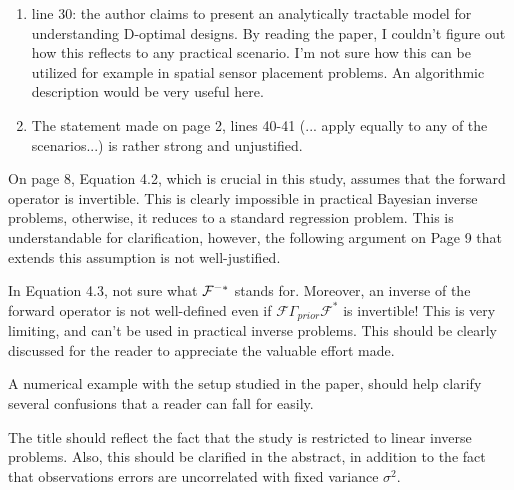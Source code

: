 \documentclass{amsart}
\begin{document}
\begin{enumerate}
\item line 30: the author claims to present an analytically tractable
  model for understanding D-optimal designs. By reading the paper, I
  couldn't figure out how this reflects to any practical scenario. I'm
  not sure how this can be utilized for example in spatial sensor
  placement problems. An algorithmic description would be very useful
  here.

\item The statement made on page 2, lines 40-41 (... apply equally to
  any of the scenarios...) is rather strong and unjustified.
\end{enumerate}

On page 8, Equation 4.2, which is crucial in this study, assumes that
the forward operator is invertible. This is clearly impossible in
practical Bayesian inverse problems, otherwise, it reduces to a
standard regression problem. This is understandable for clarification,
however, the following argument on Page 9 that extends this assumption
is not well-justified.  


In Equation 4.3, not sure what $\mathcal{F}^{-*}$ stands for. Moreover, an
inverse of the forward operator is not well-defined even if
$\mathcal{F}\Gamma_{prior}\mathcal{F}^*$ is invertible! This is very
limiting, and can't be used in practical inverse problems. This should
be clearly discussed for the reader to appreciate the valuable effort
made. 


A numerical example with the setup studied in the paper, should help
clarify several confusions that a reader can fall for easily.

The title should reflect the fact that the study is restricted to
linear inverse problems. Also, this should be clarified in the
abstract, in addition to the fact that observations errors are
uncorrelated with fixed variance $\sigma^2$.  
\end{document}
